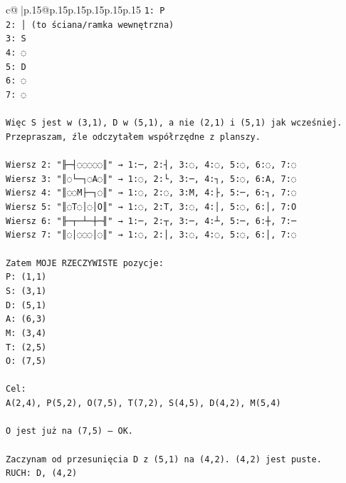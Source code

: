 \documentclass{article}
\begin{document}
{\begin{supertabular}{c@{$\;$}|p{.15\linewidth}@{}p{.15\linewidth}p{.15\linewidth}p{.15\linewidth}p{.15\linewidth}p{.15\linewidth}}
{{{\texttt{1: P} \\
\texttt{2: │ (to ściana/ramka wewnętrzna)} \\
\texttt{3: S} \\
\texttt{4: ◌} \\
\texttt{5: D} \\
\texttt{6: ◌} \\
\texttt{7: ◌} \\
\\ 
\texttt{Więc S jest w (3,1), D w (5,1), a nie (2,1) i (5,1) jak wcześniej. Przepraszam, źle odczytałem współrzędne z planszy.} \\
\\ 
\texttt{Wiersz 2: "╟─┤◌◌◌◌◌║" → 1:─, 2:┤, 3:◌, 4:◌, 5:◌, 6:◌, 7:◌} \\
\texttt{Wiersz 3: "║◌└─┐◌A◌║" → 1:◌, 2:└, 3:─, 4:┐, 5:◌, 6:A, 7:◌} \\
\texttt{Wiersz 4: "║◌◌M├─┐◌║" → 1:◌, 2:◌, 3:M, 4:├, 5:─, 6:┐, 7:◌} \\
\texttt{Wiersz 5: "║◌T◌│◌│O║" → 1:◌, 2:T, 3:◌, 4:│, 5:◌, 6:│, 7:O} \\
\texttt{Wiersz 6: "╟─┬─┴─┼─╢" → 1:─, 2:┬, 3:─, 4:┴, 5:─, 6:┼, 7:─} \\
\texttt{Wiersz 7: "║◌│◌◌◌│◌║" → 1:◌, 2:│, 3:◌, 4:◌, 5:◌, 6:│, 7:◌} \\
\\ 
\texttt{Zatem MOJE RZECZYWISTE pozycje:} \\
\texttt{P: (1,1)} \\
\texttt{S: (3,1)} \\
\texttt{D: (5,1)} \\
\texttt{A: (6,3)} \\
\texttt{M: (3,4)} \\
\texttt{T: (2,5)} \\
\texttt{O: (7,5)} \\
\\ 
\texttt{Cel:} \\
\texttt{A(2,4), P(5,2), O(7,5), T(7,2), S(4,5), D(4,2), M(5,4)} \\
\\ 
\texttt{O jest już na (7,5) – OK.} \\
\\ 
\texttt{Zaczynam od przesunięcia D z (5,1) na (4,2). (4,2) jest puste.} \\
\texttt{RUCH: D, (4,2)} \\
            }
        }
    }
     \\ \\


\end{supertabular}}
\end{document}
